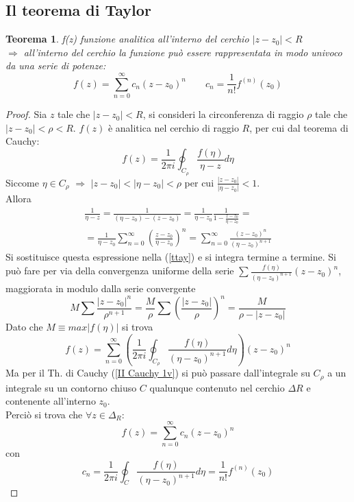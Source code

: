 \documentclass[twoside]{article}
\newtheorem{theorem}{Teorema}[section]
\begin{document}
\subsection{Il teorema di Taylor}
\begin{theorem}\label{8 T}
f(z) funzione analitica all'interno del cerchio $|z-z_0|<R$\\
$\Longrightarrow$ all'interno del cerchio la funzione può essere rappresentata in modo univoco da una serie di potenze:
\begin{equation}
    f(z)=\sum_{n=0}^\infty c_n(z-z_0)^n \qquad c_n=\frac{1}{n!}f^{(n)}(z_0)
\end{equation}
\end{theorem}
\begin{proof}
Sia $z$ tale che $|z-z_0|<R$, si consideri la circonferenza di raggio $\rho$ tale che $|z-z_0|<\rho<R$.
$f(z)$ è analitica nel cerchio di raggio $R$, per cui dal teorema di Cauchy:
\begin{equation}\label{ttay}
    f(z)=\frac{1}{2\pi i}\oint_{C_\rho}\frac{f(\eta)}{\eta-z}d\eta
\end{equation}
Siccome $\eta\in C_\rho$ $\Longrightarrow$ $|z-z_0|<|\eta-z_0|<\rho$ per cui $\frac{|z-z_0|}{|\eta-z_0|}<1$.\\
Allora
\begin{equation}\begin{split}
    \frac{1}{\eta - z}=\frac{1}{(\eta-z_0)-(z-z_0)}=\frac{1}{\eta-z_0}\frac{1}{1-\frac{z-z_0}{\eta-z_0}}=\\
    =\frac{1}{\eta - z_0}\sum_{n=0}^{\infty}\left(\frac{z-z_0}{\eta-z_0} \right)^n=\sum_{n=0}^{\infty}\frac{(z-z_0)^n}{(\eta-z_0)^{n+1}}
\end{split}\end{equation}
Si sostituisce questa espressione nella (\ref{ttay}) e si integra termine a termine. Si può fare per via della convergenza uniforme della serie $\sum \frac{f(\eta)}{(\eta - z_0)^{n+1}}(z-z_0)^n$, maggiorata in modulo dalla serie convergente
\begin{equation*}
    M\sum \frac{|z-z_0|^n}{\rho^{n+1}}=\frac{M}{\rho}\sum \left( \frac{|z-z_0|}{\rho} \right)^n=\frac{M}{\rho - |z-z_0|}
\end{equation*}
Dato che $M\equiv max|f(\eta)|$ si trova
\begin{equation}
    f(z)=\sum_{n=0}^{\infty}\left( \frac{1}{2\pi i}\oint_{C_{\rho}}\frac{f(\eta)}{(\eta -z_0)^{n+1}}d\eta \right)(z-z_0)^n
\end{equation}
Ma per il Th. di Cauchy (\ref{II Cauchy 1v}) si può passare dall'integrale su $C_{\rho}$ a un integrale su un contorno chiuso $C$ qualunque contenuto nel cerchio $\Delta R$ e contenente all'interno $z_0$.
\\
Perciò si trova che $\forall z \in \Delta_R$:
\begin{equation}
    f(z)=\sum_{n=0}^{\infty}c_n(z-z_0)^n
\end{equation}
con
\begin{equation}
    c_n=\frac{1}{2\pi i}\oint_C \frac{f(\eta)}{(\eta -z_0)^{n+1}}d\eta=\frac{1}{n!}f^{(n)}(z_0)
\end{equation}

\end{proof}
\end{document}
